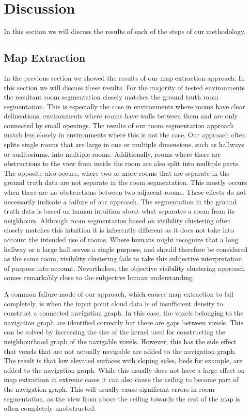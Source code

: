 \section{Discussion}
In this section we will discuss the results of each of the steps of our methodology.

\subsection{Map Extraction}
\label{section:map_extraction}
In the previous section we showed the results of our map extraction approach. In this section we will discuss these results. For the majority of tested environments the resultant room segmentation closely matches the ground truth room segmentation. This is especially the case in environments where rooms have clear delineations; environments where rooms have walls between them and are only connected by small openings. The results of our room segmentation approach match less closely in environments where this is not the case. Our approach often splits single rooms that are large in one or multiple dimensions, such as hallways or auditoriums, into multiple rooms. Additionally, rooms where there are obstructions to the view from inside the room are also split into multiple parts. The opposite also occurs, where two or more rooms that are separate in the ground truth data are not separate in the room segmentation. This mostly occurs when there are no obstructions between two adjacent rooms. These effects do not necessarily indicate a failure of our approach. The segmentation in the ground truth data is based on human intuition about what separates a room from its neighbours. Although room segmentation based on visibility clustering often closely matches this intuition it is inherently different as it does not take into account the intended use of rooms. Where humans might recognize that a long hallway or a large hall serves a single purpose, and should therefore be considered as the same room, visibility clustering fails to take this subjective interpretation of purpose into account. Nevertheless, the objective visibility clustering approach comes remarkably close to the subjective human understanding. 

A common failure mode of our approach, which causes map extraction to fail completely, is when the input point cloud data is of insufficient density to construct a connected navigation graph. In this case, the voxels belonging to the navigation graph are identified correctly but there are gaps between voxels. This can be solved by increasing the size of the kernel used for constructing the neighbourhood graph of the navigable voxels. However, this has the side effect that voxels that are not actually navigable are added to the navigation graph. The result is that low elevated surfaces with sloping sides, beds for example, are added to the navigation graph. While this usually does not have a large effect on map extraction in extreme cases it can also cause the ceiling to become part of the navigation graph. This will usually cause significant errors in room segmentation, as the view from above the ceiling towards the rest of the map is often completely unobstructed.

